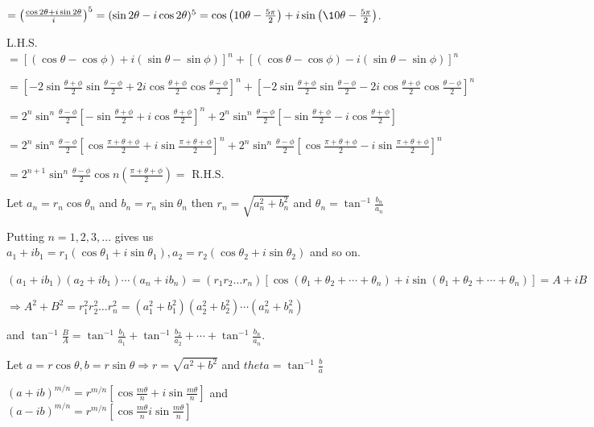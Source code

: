   $= \left(\frac{\cos2\theta + i\sin2\theta}{i}\right)^5 = (\sin2\theta -i \cos2\theta)^5
  = \cos\left(10\theta - \frac{5\pi}{2}\right) + i\sin\left(\10\theta - \frac{5\pi}{2}\right)$.
\item L.H.S. $= [(\cos\theta - \cos\phi) + i(\sin\theta - \sin\phi)]^n + [(\cos\theta - \cos\phi) -
  i(\sin\theta - \sin\phi)]^n$

  $= \left[-2\sin\frac{\theta + \phi}{2}\sin\frac{\theta - \phi}{2} + 2i\cos\frac{\theta
    + \phi}{2}\cos\frac{\theta - \phi}{2}\right]^n + \left[-2\sin\frac{\theta + \phi}{2}\sin\frac{\theta
    - \phi}{2} - 2i\cos\frac{\theta + \phi}{2}\cos\frac{\theta - \phi}{2}\right]^n$

  $= 2^n\sin^n\frac{\theta - \phi}{2}\left[-\sin\frac{\theta + \phi}{2} + i\cos\frac{\theta
    + \phi}{2}\right]^n + 2^n\sin^n\frac{\theta - \phi}{2}\left[-\sin\frac{\theta + \phi}{2} -
  i\cos\frac{\theta + \phi}{2}\right]$

  $= 2^n\sin^n\frac{\theta - \phi}{2}\left[\cos\frac{\pi + \theta + \phi}{2} + i\sin\frac{\pi + \theta
    + \phi}{2}\right]^n + 2^n\sin^n\frac{\theta - \phi}{2}\left[\cos\frac{\pi + \theta + \phi}{2} -
  i\sin\frac{\pi + \theta + \phi}{2}\right]^n$

  $= 2^{n + 1}\sin^n\frac{\theta - \phi}{2}\cos n\left(\frac{\pi + \theta + \phi}{2}\right) =$ R.H.S.
\item Let $a_n = r_n\cos\theta_n$ and $b_n = r_n\sin\theta_n$ then $r_n = \sqrt{a_n^2 + b_n^2}$ and
  $\theta_n = \tan^{-1}\frac{b_n}{a_n}$

  Putting $n = 1, 2, 3, \ldots$ gives us $a_1 + ib_1 = r_1(\cos\theta_1 + i\sin\theta_1), a_2 =
  r_2(\cos\theta_2 + i\sin\theta_2)$ and so on.

  $\left(a_1 + ib_1\right)\left(a_2 + ib_1\right)\cdots\left(a_n + ib_n\right) =
  (r_1r_2\ldots r_n)\left[\cos\left(\theta_1 + \theta_2 + \cdots + \theta_n\right) + i\sin\left(\theta_1
    + \theta_2 + \cdots + \theta_n\right)\right] = A + iB$

  $\Rightarrow A^2 + B^2 = r_1^2r_2^2\ldots r_n^2 = \left(a_1^2 + b_1^2\right)\left(a_2^2 +
  b_2^2\right)\cdots \left(a_n^2 + b_n^2\right)$

  and $\tan^{-1}\frac{B}{A} = \tan^{-1}\frac{b_1}{a_1} + \tan^{-1}\frac{b_2}{a_2} + \cdots
  + \tan^{-1}\frac{b_n}{a_n}$.
\item Let $a = r\cos\theta, b =r\sin\theta\Rightarrow r = \sqrt{a^2 + b^2}$ and $theta
  = \tan^{-1}\frac{b}{a}$

  $(a + ib)^{m/n} = r^{m/n}\left[\cos\frac{m\theta}{n} + i\sin\frac{m\theta}{n}\right]$ and $(a - ib)^{m/n}
  = r^{m/n}\left[\cos\frac{m\theta}{n}  i\sin\frac{m\theta}{n}\right]$

